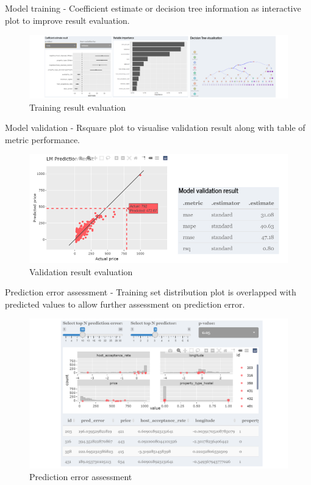 \documentclass{acm_proc_article-sp}
\begin{document}
Model training - Coefficient estimate or decision tree information as
interactive plot to improve result evaluation.

\begin{figure}[H]

{\centering \includegraphics[width=1\linewidth]{images/mdltrn} 

}

\caption{Training result evaluation}\label{fig:unnamed-chunk-12}
\end{figure}

Model validation - Rsquare plot to visualise validation result along
with table of metric performance.

\begin{figure}[H]

{\centering \includegraphics[width=1\linewidth]{images/mdleval} 

}

\caption{Validation result evaluation}\label{fig:unnamed-chunk-13}
\end{figure}

Prediction error assessment - Training set distribution plot is
overlapped with predicted values to allow further assessment on
prediction error.

\begin{figure}[H]

{\centering \includegraphics[width=1\linewidth]{images/prederror} 

}

\caption{Prediction error assessment}\label{fig:unnamed-chunk-14}
\end{figure}
\end{document}
